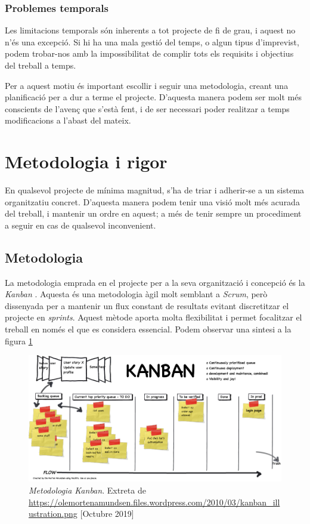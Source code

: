 \documentclass[a4paper]{article} %
\begin{document}
	\subsubsection{Problemes temporals}
	Les limitacions temporals són inherents a tot projecte de fi de grau, i aquest no n'és una excepció. Si hi ha una mala gestió del temps, o algun tipus d'imprevist, podem trobar-nos amb la impossibilitat de complir tots els requisits i objectius del treball a temps. \par
	Per a aquest motiu és important escollir i seguir una metodologia, creant una planificació per a dur a terme el projecte. D'aquesta manera podem ser molt més conscients de l'avenç que s'està fent, i de ser necessari poder realitzar a temps modificacions a l'abast del mateix.
	
	\section{Metodologia i rigor}
	En qualsevol projecte de mínima magnitud, s'ha de triar i adherir-se a un sistema organitzatiu concret. D'aquesta manera podem tenir una visió molt més acurada del treball, i mantenir un ordre en aquest; a més de tenir sempre un procediment a seguir en cas de qualsevol inconvenient.
	\subsection{Metodologia}
	La metodologia emprada en el projecte per a la seva organització i concepció és la \textit{Kanban} \cite{Anderson2010}. Aquesta és una metodologia àgil molt semblant a \textit{Scrum}, però dissenyada per a mantenir un flux constant de resultats evitant discretitzar el projecte en \textit{sprints}. Aquest mètode aporta molta flexibilitat i permet focalitzar el treball en només el que es considera essencial. Podem observar una sintesi a la figura \ref{fig:kanban}
	\par
	\begin{figure}[h]
		\includegraphics[width=\linewidth]{images/kanban_illustration.png}
		\caption[\textit{Metodologia Kanban}]{\textit{\small Metodologia Kanban}. Extreta de \url{https://olemortenamundsen.files.wordpress.com/2010/03/kanban_illustration.png} [Octubre 2019]}
		\label{fig:kanban}
	\end{figure}
\end{document}
